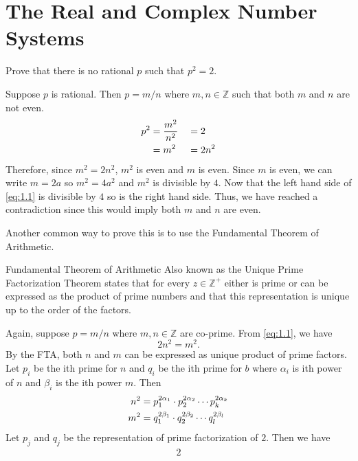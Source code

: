 \chapter{The Real and Complex Number Systems}
\label{ch1}

\begin{example}
\item
    Prove that there is no rational \(p\) such that \(p^2 = 2\).
    \par\smallskip
    Suppose \(p\) is rational. Then \(p = m/n\) where \(m, n\in\mathbb{Z}\) such that both \(m\) and \(n\) are not 
    even.
    \begin{alignat}{3}
    	p^2 &= \frac{m^2}{n^2} &&= 2\notag\\
    	&= m^2 &&= 2n^2 \label{eq:1.1}
    \end{alignat}
    Therefore, since \(m^2 = 2n^2\), \(m^2\) is even and \(m\) is even. Since \(m\) is even, we can write \(m = 2a\) so
    \(m^2 = 4a^2\) and \(m^2\) is divisible by \(4\). Now that the left hand side of \cref{eq:1.1} is divisible by 
    \(4\) so is the right hand side. Thus, we have reached a contradiction since this would imply both \(m\) and \(n\) 
    are even.
    \par\smallskip
    Another common way to prove this is to use the Fundamental Theorem of Arithmetic.
    \begin{Theorems}{Fundamental Theorem of Arithmetic}{}
    	Also known as the Unique Prime Factorization Theorem states that for every \(z\in\mathbb{Z}^+\) either is prime
    	or can be expressed as the product of prime numbers and that this representation is unique up to the order of
    	the factors.
    \end{Theorems}
    Again, suppose \(p = m / n\) where \(m, n\in\mathbb{Z}\) are co-prime. From \cref{eq:1.1}, we have
    \[
    	2n^2 = m^2.
    \]
    By the FTA, both \(n\) and \(m\) can be expressed as unique product of prime factors. Let \(p_i\) be the ith prime 
    for \(n\) and \(q_i\) be the ith prime for \(b\) where \(\alpha_i\) is ith power of \(n\) and \(\beta_i\) is the ith power 
    \(m\). Then
    \begin{align}
    	n^2 &= p_1^{2\alpha_1}\cdot  p_2^{2\alpha_2}\cdots  p_k^{2\alpha_k}\notag\\
    	m^2 &= q_1^{2\beta_1}\cdot  q_2^{2\beta_2}\cdots  q_l^{2\beta_l}\notag
    \end{align}
    Let \(p_j\) and \(q_j\) be the representation of prime factorization of \(2\). Then we have
    \begin{alignat}{2}

\end{alignat}
\end{example}
